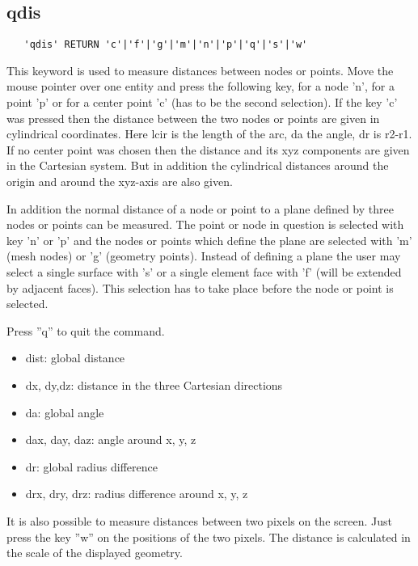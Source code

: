 \documentclass{article}
\begin{document}
\subsection{\label{qdis}qdis}
\begin{verbatim}
   'qdis' RETURN 'c'|'f'|'g'|'m'|'n'|'p'|'q'|'s'|'w' 
\end{verbatim}
This keyword is used to measure distances between nodes or points. Move the mouse pointer over one entity and press the following key, for a node 'n', for a point 'p' or for a center point 'c' (has to be the second selection). If the key 'c' was pressed then the distance between the two nodes or points are given in cylindrical coordinates. Here lcir is the length of the arc, da the angle, dr is r2-r1. If no center point was chosen then the distance and its xyz components are given in the Cartesian system. But in addition the cylindrical distances around the origin and around the xyz-axis are also given.

In addition the normal distance of a node or point to a plane defined by three nodes or points can be measured. The point or node in question is selected with key 'n' or 'p' and the nodes or points which define the plane are selected with 'm' (mesh nodes) or 'g' (geometry points). Instead of defining a plane the user may select a single surface with 's' or a single element face with 'f' (will be extended by adjacent faces). This selection has to take place before the node or point is selected.

Press ''q'' to quit the command.

\begin{itemize}
\item dist: global distance
\item dx, dy,dz: distance in the three Cartesian directions
\item da: global angle
\item dax, day, daz: angle around x, y, z
\item dr: global radius difference
\item drx, dry, drz: radius difference around x, y, z
\end{itemize}

It is also possible to measure distances between two pixels on the screen. Just press the key ''w'' on the positions of the two pixels. The distance is calculated in the scale of the displayed geometry.
\end{document}
